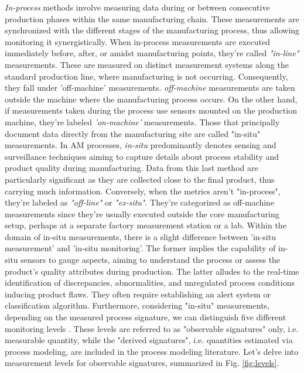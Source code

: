 \emph{In-process} methods involve measuring data during or between consecutive production phases within the same manufacturing chain. These measurements are synchronized with the different stages of the manufacturing process, thus allowing monitoring it synergistically. When in-process measurements are executed immediately before, after, or amidst manufacturing points, they're called \emph{"in-line"} measurements. These are measured on distinct measurement systems along the standard production line, where manufacturing is not occurring. Consequently, they fall under 'off-machine' measurements. \emph{off-machine} measurements are taken outside the machine where the manufacturing process occurs. On the other hand, if measurements taken during the process use sensors mounted on the production machine, they're labeled \emph{'on-machine'} measurements. Those that principally document data directly from the manufacturing site are called "in-situ" measurements. In AM processes, \emph{in-situ} predominantly denotes sensing and surveillance techniques aiming to capture details about process stability and product quality during manufacturing. Data from this last method are particularly significant as they are collected close to the final product, thus carrying much information. Conversely, when the metrics aren't "in-process", they're labeled as \emph{"off-line"} or \emph{"ex-situ"}. They're categorized as off-machine measurements since they're usually executed outside the core manufacturing setup, perhaps at a separate factory measurement station or a lab. Within the domain of in-situ measurements, there is a slight difference between 'in-situ measurement' and 'in-situ monitoring'. The former implies the capability of in-situ sensors to gauge aspects, aiming to understand the process or assess the product's quality attributes during production. The latter alludes to the real-time identification of discrepancies, abnormalities, and unregulated process conditions inducing product flaws. They often require establishing an alert system or classification algorithm. Furthermore, considering "in-situ" measurements, depending on the measured process signature, we can distinguish five different monitoring levels \cite{grasso_-situ_2021, grasso_process_2017}. These levels are referred to as "observable signatures" only, i.e. measurable quantity, while the "derived signatures", i.e. quantities estimated via process modeling, are included in the process modeling literature. Let's delve into measurement levels for observable signatures, summarized in Fig. \ref{fig:levels}.
